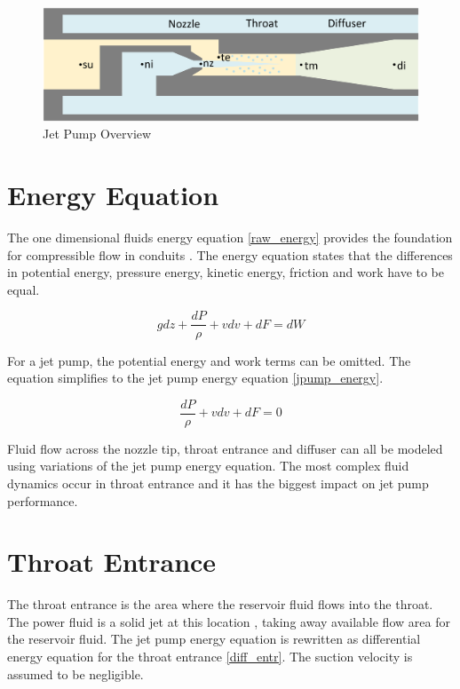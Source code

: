 \documentclass{article}
\begin{document}
\begin{figure}
    \centering
    \includegraphics[width=1\linewidth]{figures/jetpump_ovr1.png}
    \caption{Jet Pump Overview}
    \label{fig:jetpump_side}
\end{figure}

\section{Energy Equation}

The one dimensional fluids energy equation \eqref{raw_energy} provides the foundation for compressible flow in conduits \cite{fluids_cheme}. The energy equation states that the differences in potential energy, pressure energy, kinetic energy, friction and work have to be equal.

\begin{equation}
gdz + \frac{dP}{\rho} + vdv + dF = dW
\label{raw_energy}
\end{equation}

For a jet pump, the potential energy and work terms can be omitted. The equation simplifies to the jet pump energy equation \eqref{jpump_energy}.

\begin{equation}
\frac{dP}{\rho} + vdv + dF = 0
\label{jpump_energy}
\end{equation}

Fluid flow across the nozzle tip, throat entrance and diffuser can all be modeled using variations of the jet pump energy equation. The most complex fluid dynamics occur in throat entrance and it has the biggest impact on jet pump performance.

\section{Throat Entrance}

The throat entrance is the area where the reservoir fluid flows into the throat. The power fluid is a solid jet at this location \cite{cunn_break}, taking away available flow area for the reservoir fluid. The jet pump energy equation is rewritten as differential energy equation for the throat entrance \eqref{diff_entr}. The suction velocity is assumed to be negligible.
\end{document}

